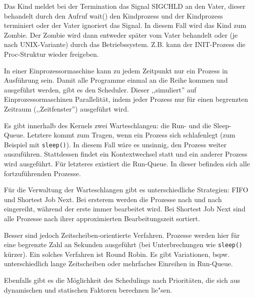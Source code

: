 \begin{answer}
  Das Kind meldet bei der Termination das Signal SIGCHLD an den Vater, dieser behandelt
  durch den Aufruf wait() den Kindprozess und der Kindprozess terminiert
  oder der Vater ignoriert das Signal. In diesem Fall wird das Kind zum Zombie. Der Zombie
  wird dann entweder später vom Vater behandelt oder (je nach UNIX-Variante) durch das
  Betriebssystem. Z.B. kann der INIT-Prozess die Proc-Struktur wieder freigeben.
\end{answer}

\begin{answer}
  In einer Einprozessormaschine kann zu jedem Zeitpunkt nur ein Prozess in Ausführung sein.
  Damit alle Programme einmal an die Reihe kommen und ausgeführt werden, gibt es den Scheduler.
  Dieser ,,simuliert'' auf Einprozessormaschinen Parallelität, indem jeder Prozess nur für
  einen begrenzten Zeitraum (,,Zeitfenster'') ausgeführt wird.

  Es gibt innerhalb des Kernels zwei Warteschlangen: die Run- und die Sleep-Queue.
  Letztere kommt zum Tragen, wenn ein Prozess sich schlafenlegt (zum Beispiel mit \texttt{sleep()}).
  In diesem Fall wäre es unsinnig, den Prozess weiter auszuführen. Stattdessen findet ein Kontextwechsel
  statt und ein anderer Prozess wird ausgeführt. Für letzteres existiert die Run-Queue. In dieser befinden
  sich alle fortzuführenden Prozesse.

  Für die Verwaltung der Warteschlangen gibt es unterschiedliche Strategien: FIFO und Shortest Job Next.
  Bei ersterem werden die Prozesse nach und nach eingereiht, während der erste immer bearbeitet wird.
  Bei Shortest Job Next sind alle Prozesse nach ihrer approximierten Bearbeitungszeit sortiert.

  Besser sind jedoch Zeitscheiben-orientierte Verfahren. Prozesse werden hier für eine begrenzte
  Zahl an Sekunden ausgeführt (bei Unterbrechungen wie \texttt{sleep()} kürzer). Ein solches Verfahren ist Round Robin.
  Es gibt Variationen, bspw. unterschiedlich lange Zeitscheiben oder mehrfaches Einreihen in Run-Queue.

  Ebenfalls gibt es die Möglichkeit des Schedulings nach Prioritäten, die sich aus dynamischen und statischen
  Faktoren berechnen lie"sen.
\end{answer}

